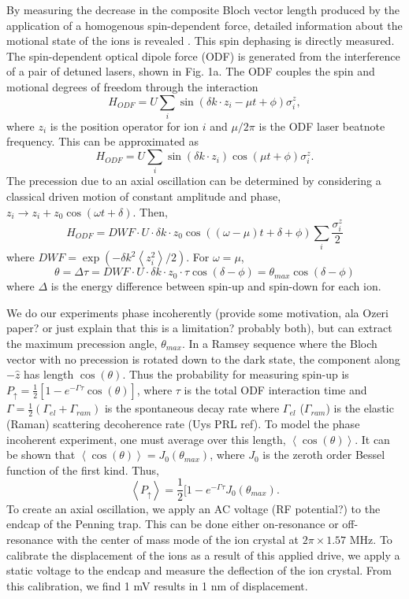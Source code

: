 \documentclass[aps,prl,twocolumn,groupedaddress]{revtex4-1}
\begin{document}
By measuring the decrease in the composite Bloch vector length produced by the application of a homogenous spin-dependent force, detailed information about the motional state of the ions is revealed \citep{}. This spin dephasing is directly measured. The spin-dependent optical dipole force (ODF) is generated from the interference of a pair of detuned lasers, shown in Fig. 1a. The ODF couples the spin and motional degrees of freedom through the interaction 
\begin{equation}
H_{ODF} = U\sum_{i}\sin(\delta k \cdot z_i - \mu t + \phi)\sigma^{z}_i,
\end{equation}
where $z_i$ is the position operator for ion $i$ and $\mu/2\pi$ is the ODF laser beatnote frequency. This can be approximated as
\[H_{ODF} = U\sum_{i}\sin(\delta k \cdot z_i)\cos(\mu t + \phi)\sigma^{z}_i. \]
The precession due to an axial oscillation can be determined by considering a classical driven motion of constant amplitude and phase, $z_i \rightarrow z_i +z_0\cos(\omega t+\delta)$.
Then,
\[H_{ODF} = DWF \cdot U \cdot \delta k \cdot z_0\cos((\omega - \mu)t + \delta + \phi) \sum_{i} \frac{\sigma^{z}_{i}}{2} \]
where $DWF = \exp(-\delta k^2 \left< z^{2}_{i} \right> /2) $.
For $ \omega = \mu $,
\[\theta = \Delta\tau = DWF \cdot U \cdot \delta k \cdot z_0 \cdot \tau \cos(\delta - \phi) = \theta_{max}\cos(\delta - \phi)\]
where $\Delta$ is the energy difference between spin-up and spin-down for each ion.

We do our experiments phase incoherently (provide some motivation, ala Ozeri paper? or just explain that this is a limitation? probably both), but can extract the maximum precession angle, $\theta_{max}$. In a Ramsey sequence where the Bloch vector with no precession is rotated down to the dark state, the component along $-\hat{z}$ has length $\cos(\theta)$. Thus the probability for measuring spin-up is $P_{\uparrow} = \frac{1}{2}[1-e^{-\Gamma \tau} \cos(\theta)]$, where $\tau$ is the total ODF interaction time and $\Gamma = \frac{1}{2}(\Gamma_{el} + \Gamma_{ram})$ is the spontaneous decay rate where $\Gamma_{el}$ ($\Gamma_{ram}$) is the elastic (Raman) scattering decoherence rate (Uys PRL ref). To model the phase incoherent experiment, one must average over this length, $ \left< \cos(\theta) \right> $. It can be shown that $ \left< \cos(\theta) \right> = J_0(\theta_{max}) $, where $J_0$ is the zeroth order Bessel function of the first kind. Thus,
\begin{equation}
\left< P_{\uparrow} \right> = \frac{1}{2} [1-e^{-\Gamma \tau}J_0(\theta_{max}).
\end{equation}
To create an axial oscillation, we apply an AC voltage (RF potential?) to the endcap of the Penning trap. This can be done either on-resonance or off-resonance with the center of mass mode of the ion crystal at $2\pi \times 1.57$ MHz. To calibrate the displacement of the ions as a result of this applied drive, we apply a static voltage to the endcap and measure the deflection of the ion crystal. From this calibration, we find 1 mV results in 1 nm of displacement.
\end{document}
